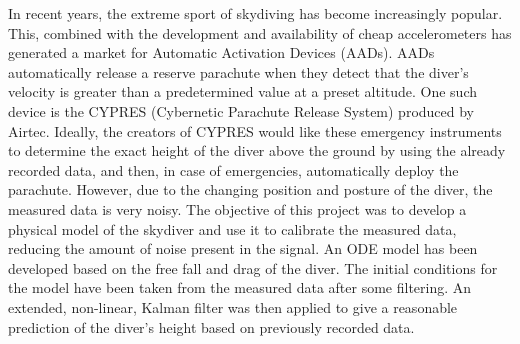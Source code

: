 \documentclass[11pt]{article}
\begin{document}
In recent years, the extreme sport of skydiving has become increasingly popular. This, combined with the development
and availability of cheap accelerometers has generated a market for Automatic Activation Devices (AADs). AADs
automatically release a reserve parachute when they detect that the diver's velocity is greater than a predetermined
value at a preset altitude. One such device is the CYPRES (Cybernetic Parachute Release System) produced by Airtec.
Ideally, the creators of CYPRES would like these emergency instruments to determine the exact height of the diver above the ground by using the already recorded data, and then, in case of emergencies, automatically deploy the parachute. However, due to the changing position and posture of the diver, the measured data
is very noisy. The objective of this project was to develop a physical model of the skydiver and use it to calibrate the measured data, reducing the amount of noise present in the signal. An ODE model has been developed based on the free fall and drag of the diver. The initial conditions for the model have been taken from the measured data after some filtering. An extended, non-linear, Kalman filter was then applied to give a reasonable prediction of the diver's height based on previously recorded data.
\end{document}
